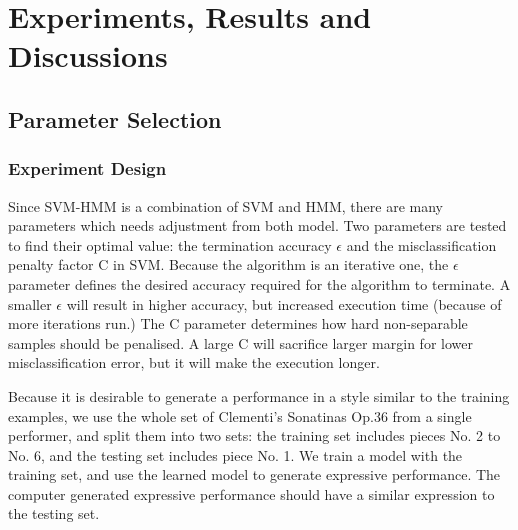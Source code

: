 \chapter{Experiments, Results and Discussions}
\label{chap:exp}
\section{Parameter Selection}
\subsection{Experiment Design}
Since SVM-HMM is a combination of SVM and HMM, there are many parameters which needs adjustment from both model. Two parameters are tested to find their optimal value: the termination accuracy $\epsilon$ and the misclassification penalty factor C in SVM. Because the algorithm is an iterative one, the $\epsilon$ parameter defines the desired accuracy required for the algorithm to terminate. A smaller $\epsilon$ will result in higher accuracy, but increased execution time (because of more iterations run.) The C parameter determines how hard non-separable samples should be penalised. A large C will sacrifice larger margin for lower misclassification error, but it will make the execution longer.%

Because it is desirable to generate a performance in a style similar to the training examples, we use the whole set of Clementi's Sonatinas Op.36 from a single performer, and split them into two sets: the training set includes pieces No. 2 to No. 6, and the testing set includes piece No. 1. We train a model with the training set, and use the learned model to generate expressive performance. The computer generated expressive performance should have a similar expression to the testing set. 



